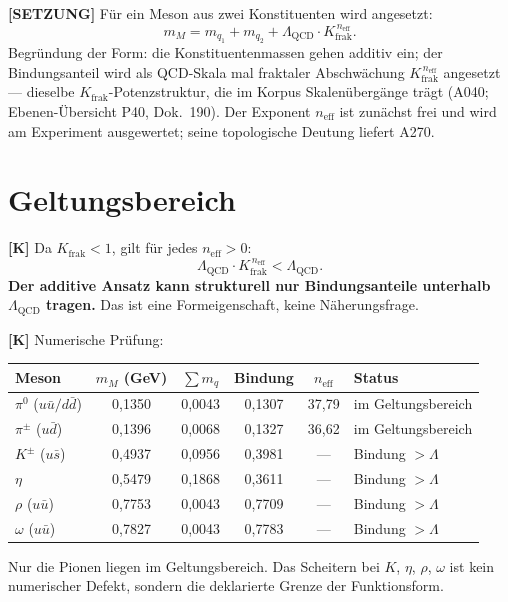 \textbf{[SETZUNG]} Für ein Meson aus zwei Konstituenten wird angesetzt:
\[
  m_M = m_{q_1} + m_{q_2}
  + \Lambda_\text{QCD}\cdot K_\text{frak}^{\,n_\text{eff}}.
\]
Begründung der Form: die Konstituentenmassen gehen additiv ein; der
Bindungsanteil wird als QCD-Skala mal fraktaler Abschwächung
$K_\text{frak}^{\,n_\text{eff}}$ angesetzt --- dieselbe
$K_\text{frak}$-Potenzstruktur, die im Korpus Skalenübergänge trägt
(A040; Ebenen-Übersicht P40, Dok.~190). Der Exponent $n_\text{eff}$
ist zunächst frei und wird am Experiment ausgewertet; seine
topologische Deutung liefert A270.

\section{Geltungsbereich}

\textbf{[K]} Da $K_\text{frak} < 1$, gilt für jedes $n_\text{eff} > 0$:
\[
  \Lambda_\text{QCD}\cdot K_\text{frak}^{\,n_\text{eff}} < \Lambda_\text{QCD}.
\]
\textbf{Der additive Ansatz kann strukturell nur Bindungsanteile
unterhalb $\Lambda_\text{QCD}$ tragen.} Das ist eine Formeigenschaft,
keine Näherungsfrage.

\medskip
\textbf{[K]} Numerische Prüfung:

\begin{center}
\renewcommand{\arraystretch}{1.3}
{\small\begin{tabular}{lcccc l}
\toprule
Meson & $m_M$ (GeV) & $\sum m_q$ & Bindung & $n_\text{eff}$ & Status \\
\midrule
$\pi^0$ ($u\bar u/d\bar d$) & 0{,}1350 & 0{,}0043 & 0{,}1307 & 37{,}79 & im Geltungsbereich \\
$\pi^\pm$ ($u\bar d$)       & 0{,}1396 & 0{,}0068 & 0{,}1327 & 36{,}62 & im Geltungsbereich \\
$K^\pm$ ($u\bar s$)         & 0{,}4937 & 0{,}0956 & 0{,}3981 & --- & Bindung $>\Lambda$ \\
$\eta$                      & 0{,}5479 & 0{,}1868 & 0{,}3611 & --- & Bindung $>\Lambda$ \\
$\rho$ ($u\bar u$)          & 0{,}7753 & 0{,}0043 & 0{,}7709 & --- & Bindung $>\Lambda$ \\
$\omega$ ($u\bar u$)        & 0{,}7827 & 0{,}0043 & 0{,}7783 & --- & Bindung $>\Lambda$ \\
\bottomrule
\end{tabular}}
\renewcommand{\arraystretch}{1.0}
\end{center}

Nur die Pionen liegen im Geltungsbereich. Das Scheitern bei $K$, $\eta$,
$\rho$, $\omega$ ist kein numerischer Defekt, sondern die deklarierte
Grenze der Funktionsform.

